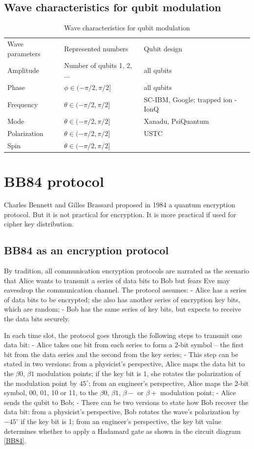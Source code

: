 \documentclass[oneside, letter, 12pt]{book}
\begin{document}
\subsection{Wave characteristics for qubit modulation}
\begin{table}[]
\caption{Wave characteristics for qubit modulation}
\label{modulation-characteristics}
\begin{tabular}{lll}
Wave parameters &Represented numbers &Qubit design   \\
Amplitude & Number of qubits 1, 2, ... & all qubits \\
Phase & $\phi \in (-\pi /2, \pi /2] $& all qubits \\
Frequency & $\theta \in (-\pi /2, \pi /2]$ & SC-IBM, Google; trapped ion - IonQ \\
Mode & $\theta \in (-\pi /2, \pi /2]$ & Xanadu, PsiQuantum \\
Polarization & $\theta \in (-\pi /2, \pi /2]$ & USTC \\
Spin & $\theta \in (-\pi /2, \pi /2]$ & 
\end{tabular}
\end{table}

\section{BB84 protocol}
Charles Bennett and Gilles Brassard proposed in 1984 a quantum encryption protocol\cite{BB84}. But it is not practical for encryption. It is more practical if used for cipher key distribution.

\subsection{BB84 as an encryption protocol}
By tradition, all communication encryption protocols are narrated as the scenario that Alice wants to transmit a series of data bits to Bob but fears Eve may eavesdrop the communication channel\cite{Schneier}. The protocol assumes:
- Alice has a series of data bits to be encrypted; she also has another series of encryption key bits, which are random;
- Bob has the same series of key bits, but expects to receive the data bits securely.

In each time slot, the protocol goes through the following steps to transmit one data bit:
- Alice takes one bit from each series to form a 2-bit symbol -- the first bit from the data series and the second from the key series;
- This step can be stated in two versions: from a physicist's perspective, Alice maps the data bit to the $\beta{0}$, $\beta{1}$ modulation points; if the key bit is 1, she rotates the polarization of the modulation point by $45^\circ$; from an engineer's perspective, Alice maps the 2-bit symbol, 00, 01, 10 or 11, to the $\beta{0}$, $\beta{1}$, $\beta{-}$ or $\beta{+}$ modulation point;
- Alice sends the qubit to Bob;
- There can be two versions to state how Bob recover the data bit: from a physicist's perspective, Bob rotates the wave's polarization by $-45^\circ$ if the key bit is 1; from an engineer's perspective, the key bit value determines whether to apply a Hadamard gate as shown in the circuit diagram \ref{BB84}.
\end{document}
